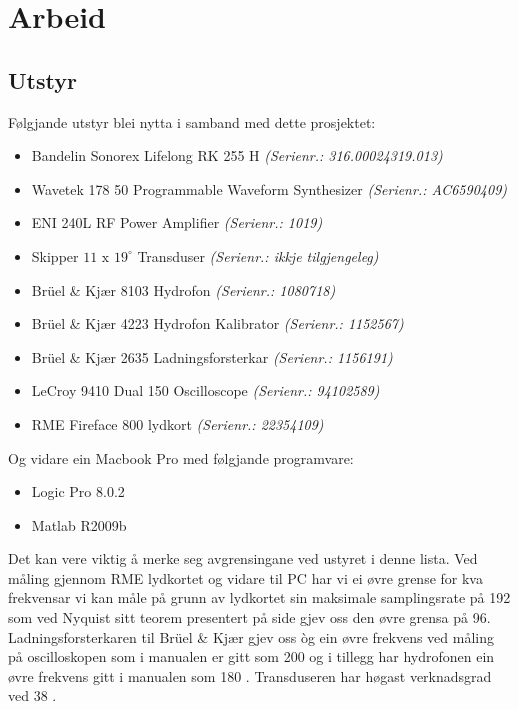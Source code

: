 \section{Arbeid}
\subsection{Utstyr}
Følgjande utstyr blei nytta i samband med dette prosjektet:
\begin{itemize}
	\item Bandelin Sonorex Lifelong RK 255 H \textit{(Serienr.: 316.00024319.013)}
	\item Wavetek 178 \unit{50}{\mega\hertz} Programmable Waveform Synthesizer \textit{(Serienr.: AC6590409)}
	\item ENI 240L RF Power Amplifier \textit{(Serienr.: 1019)}
	\item Skipper $11\text{ x }{19}^\circ$ Transduser \textit{(Serienr.: ikkje tilgjengeleg)}
	\item Brüel \& Kjær 8103 Hydrofon \textit{(Serienr.: 1080718)}
	\item Brüel \& Kjær 4223 Hydrofon Kalibrator \textit{(Serienr.: 1152567)}
	\item Brüel \& Kjær 2635 Ladningsforsterkar \textit{(Serienr.: 1156191)}
	\item LeCroy 9410 Dual \unit{150}{\mega\hertz} Oscilloscope \textit{(Serienr.: 94102589)}
	\item RME Fireface 800 lydkort \textit{(Serienr.: 22354109)}
\end{itemize}

Og vidare ein Macbook Pro med følgjande programvare:

\begin{itemize}
	\item Logic Pro 8.0.2
	\item Matlab R2009b
\end{itemize}

Det kan vere viktig å merke seg avgrensingane ved ustyret i denne lista. Ved måling gjennom RME lydkortet og vidare til PC har vi ei øvre grense for kva frekvensar vi kan måle på grunn av lydkortet sin maksimale samplingsrate på \unit{192}{\kilo\hertz} som ved Nyquist sitt teorem presentert på side \pageref{nyquist} gjev oss den øvre grensa på \unit{96}{\kilo\hertz}. Ladningsforsterkaren til Brüel \& Kjær gjev oss òg ein øvre frekvens ved måling på oscilloskopen som i manualen er gitt som \unit{200}{\kilo\hertz} \cite{ladnforsterker} og i tillegg har hydrofonen ein øvre frekvens gitt i manualen som \unit{180}{\kilo\hertz} \cite{hydrofon}. Transduseren har høgast verknadsgrad ved \unit{38}{\kilo\hertz} \cite{skipper}. 

